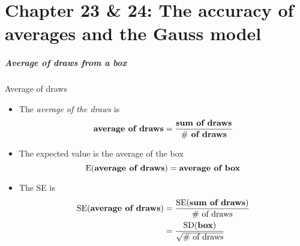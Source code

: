 \documentclass[handout]{beamer}
\begin{document}
   \part{Chapter 23 \& 24: The accuracy of averages and the Gauss model}
   \frame{\partpage}


   \begin{frame} \frametitle{Average of draws from a box}

   \begin{block}
   {Average of draws}
   \begin{itemize}
   \item The {\em average of the draws} is
   $$
   \text{\bf average of draws} = \frac{\text{\bf sum of draws}}{\text{{\bf $\#$ of draws}}}
   $$
   \item The expected value is the average of the box
   $$
   \text{E({\bf average of draws})} = \text{\bf average of box}
   $$

   \item The SE is
   $$
   \begin{aligned}
      \text{SE({\bf average of draws})} &= \frac{\text{SE({\bf sum of draws})}}{\text{$\#$ of draws}}      \\
      &= \frac{\text{SD({\bf box})}}{\sqrt{\text{$\#$ of draws}}}      \\
   \end{aligned}
   $$
   \end{itemize}
   \end{block}
   \end{frame}

\end{document}
